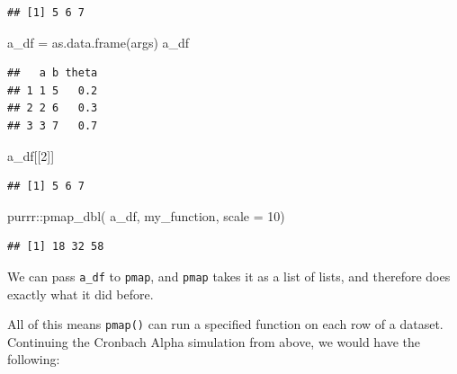 \documentclass[
]{book}
\newenvironment{Shaded}{\begin{snugshade}}{\end{snugshade}}
\newcommand{\AttributeTok}[1]{\textcolor[rgb]{0.77,0.63,0.00}{#1}}
\newcommand{\DecValTok}[1]{\textcolor[rgb]{0.00,0.00,0.81}{#1}}
\newcommand{\FunctionTok}[1]{\textcolor[rgb]{0.00,0.00,0.00}{#1}}
\newcommand{\NormalTok}[1]{#1}
\newcommand{\OtherTok}[1]{\textcolor[rgb]{0.56,0.35,0.01}{#1}}
\newcommand{\SpecialCharTok}[1]{\textcolor[rgb]{0.00,0.00,0.00}{#1}}
\begin{document}
\begin{verbatim}
## [1] 5 6 7
\end{verbatim}

\begin{Shaded}
\begin{Highlighting}[]
\NormalTok{a\_df }\OtherTok{=} \FunctionTok{as.data.frame}\NormalTok{(args)}
\NormalTok{a\_df}
\end{Highlighting}
\end{Shaded}

\begin{verbatim}
##   a b theta
## 1 1 5   0.2
## 2 2 6   0.3
## 3 3 7   0.7
\end{verbatim}

\begin{Shaded}
\begin{Highlighting}[]
\NormalTok{a\_df[[}\DecValTok{2}\NormalTok{]]}
\end{Highlighting}
\end{Shaded}

\begin{verbatim}
## [1] 5 6 7
\end{verbatim}

\begin{Shaded}
\begin{Highlighting}[]
\NormalTok{purrr}\SpecialCharTok{::}\FunctionTok{pmap\_dbl}\NormalTok{( a\_df, my\_function, }\AttributeTok{scale =} \DecValTok{10}\NormalTok{)}
\end{Highlighting}
\end{Shaded}

\begin{verbatim}
## [1] 18 32 58
\end{verbatim}

We can pass \texttt{a\_df} to \texttt{pmap}, and \texttt{pmap} takes it as a list of lists, and therefore does exactly what it did before.

All of this means \texttt{pmap()} can run a specified function on each row of a dataset.
Continuing the Cronbach Alpha simulation from above, we would have the following:

\begin{Shaded}
\end{Shaded}
\end{document}
